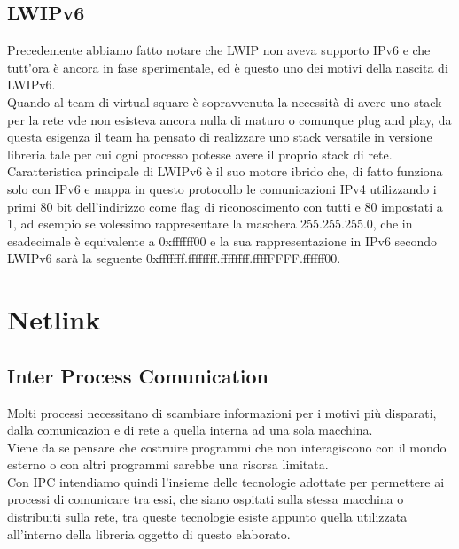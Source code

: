 \subsection{LWIPv6}
Precedemente abbiamo fatto notare che LWIP non aveva supporto IPv6 e che tutt'ora \`e ancora in fase sperimentale, ed \`e questo uno dei motivi della nascita di LWIPv6.\\
Quando al team di virtual square \`e sopravvenuta la necessit\`a di avere uno stack per la rete vde non esisteva ancora nulla di maturo o comunque plug and play, da questa esigenza il team ha pensato di realizzare uno stack versatile in versione libreria tale per cui ogni processo potesse avere il proprio stack di rete.\\
Caratteristica principale di LWIPv6 \`e il suo motore ibrido che, di fatto funziona solo con IPv6 e mappa in questo protocollo le comunicazioni IPv4 utilizzando i primi 80 bit dell'indirizzo come flag di riconoscimento con tutti e 80 impostati a 1, ad esempio se volessimo rappresentare la maschera 255.255.255.0, che in esadecimale \`e equivalente a 0xffffff00 e la sua rappresentazione in IPv6 secondo LWIPv6 sar\`a la seguente 0xfffffff.ffffffff.ffffffff.ffffFFFF.ffffff00.
\section{Netlink}
\subsection{Inter Process Comunication}
Molti processi necessitano di scambiare informazioni per i motivi pi\`u disparati, dalla comunicazion e di rete a quella interna ad una sola macchina.\\
Viene da se pensare che costruire programmi che non interagiscono con il mondo esterno o con altri programmi sarebbe una risorsa limitata.\\
Con IPC intendiamo quindi l'insieme delle tecnologie adottate per permettere ai processi di comunicare tra essi, che siano ospitati sulla stessa macchina o distribuiti sulla rete, tra queste tecnologie esiste appunto quella utilizzata all'interno della libreria oggetto di questo elaborato.
